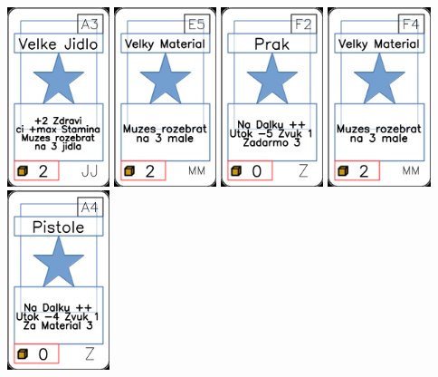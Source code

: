 \documentclass[a4paper]{article}
\begin{document}
	\includegraphics[width=3.0cm]{img-1_32}
	\includegraphics[width=3.0cm]{img-1_54}
	\includegraphics[width=3.0cm]{img-1_86}
	\includegraphics[width=3.0cm]{img-1_58}
	\includegraphics[width=3.0cm]{img-1_93}
\end{document}
